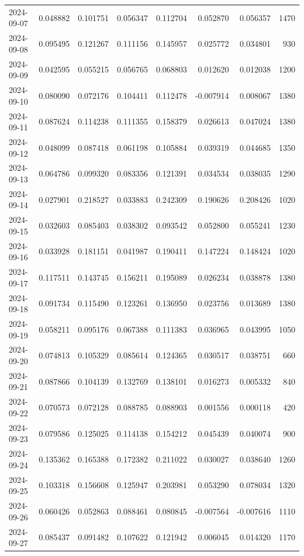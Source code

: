 \begin{tabular}{lrrrrrrr}
2024-09-07 & 0.048882 & 0.101751 & 0.056347 & 0.112704 & 0.052870 & 0.056357 & 1470 \\
2024-09-08 & 0.095495 & 0.121267 & 0.111156 & 0.145957 & 0.025772 & 0.034801 & 930 \\
2024-09-09 & 0.042595 & 0.055215 & 0.056765 & 0.068803 & 0.012620 & 0.012038 & 1200 \\
2024-09-10 & 0.080090 & 0.072176 & 0.104411 & 0.112478 & -0.007914 & 0.008067 & 1380 \\
2024-09-11 & 0.087624 & 0.114238 & 0.111355 & 0.158379 & 0.026613 & 0.047024 & 1380 \\
2024-09-12 & 0.048099 & 0.087418 & 0.061198 & 0.105884 & 0.039319 & 0.044685 & 1350 \\
2024-09-13 & 0.064786 & 0.099320 & 0.083356 & 0.121391 & 0.034534 & 0.038035 & 1290 \\
2024-09-14 & 0.027901 & 0.218527 & 0.033883 & 0.242309 & 0.190626 & 0.208426 & 1020 \\
2024-09-15 & 0.032603 & 0.085403 & 0.038302 & 0.093542 & 0.052800 & 0.055241 & 1230 \\
2024-09-16 & 0.033928 & 0.181151 & 0.041987 & 0.190411 & 0.147224 & 0.148424 & 1020 \\
2024-09-17 & 0.117511 & 0.143745 & 0.156211 & 0.195089 & 0.026234 & 0.038878 & 1380 \\
2024-09-18 & 0.091734 & 0.115490 & 0.123261 & 0.136950 & 0.023756 & 0.013689 & 1380 \\
2024-09-19 & 0.058211 & 0.095176 & 0.067388 & 0.111383 & 0.036965 & 0.043995 & 1050 \\
2024-09-20 & 0.074813 & 0.105329 & 0.085614 & 0.124365 & 0.030517 & 0.038751 & 660 \\
2024-09-21 & 0.087866 & 0.104139 & 0.132769 & 0.138101 & 0.016273 & 0.005332 & 840 \\
2024-09-22 & 0.070573 & 0.072128 & 0.088785 & 0.088903 & 0.001556 & 0.000118 & 420 \\
2024-09-23 & 0.079586 & 0.125025 & 0.114138 & 0.154212 & 0.045439 & 0.040074 & 900 \\
2024-09-24 & 0.135362 & 0.165388 & 0.172382 & 0.211022 & 0.030027 & 0.038640 & 1260 \\
2024-09-25 & 0.103318 & 0.156608 & 0.125947 & 0.203981 & 0.053290 & 0.078034 & 1320 \\
2024-09-26 & 0.060426 & 0.052863 & 0.088461 & 0.080845 & -0.007564 & -0.007616 & 1110 \\
2024-09-27 & 0.085437 & 0.091482 & 0.107622 & 0.121942 & 0.006045 & 0.014320 & 1170 \\

\end{tabular}
